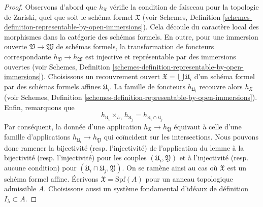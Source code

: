 \begin{proof}
Observons d'abord que $h_\mathfrak X$ vérifie la condition de faisceau pour
la topologie de Zariski, quel que soit le schéma formel $\mathfrak X$ (voir
Schemes, Definition \ref{schemes-definition-representable-by-open-immersions}).
Cela découle du caractère local des morphismes dans la catégorie
des schémas formels. En outre, pour une immersion ouverte
$\mathfrak V \to \mathfrak W$ de schémas formels,
la transformation de foncteurs correspondante $h_\mathfrak V \to h_\mathfrak W$
est injective et représentable par des immersions ouvertes (voir
Schemes, Definition \ref{schemes-definition-representable-by-open-immersions}).
Choisissons un recouvrement ouvert $\mathfrak X = \bigcup \mathfrak U_i$
d'un schéma formel par des schémas formels affines $\mathfrak U_i$.
La famille de foncteurs
$h_{\mathfrak U_i}$ recouvre alors $h_\mathfrak X$ (voir
Schemes, Definition \ref{schemes-definition-representable-by-open-immersions}).
Enfin, remarquons que
$$
h_{\mathfrak U_i} \times_{h_\mathfrak X} h_{\mathfrak U_j} =
h_{\mathfrak U_i \cap \mathfrak U_j}
$$
Par conséquent, la donnée d'une application $h_\mathfrak X \to h_\mathfrak Y$
équivaut à celle d'une famille d'applications
$h_{\mathfrak U_i} \to h_\mathfrak Y$ qui coïncident sur les intersections.
Nous pouvons donc ramener la bijectivité (resp. l'injectivité) de l'application
du lemme à la bijectivité (resp. l'injectivité) pour les couples
$(\mathfrak U_i, \mathfrak Y)$
et à l'injectivité (resp. aucune condition)
pour $(\mathfrak U_i \cap \mathfrak U_j, \mathfrak Y)$.
On se ramène ainsi au cas où $\mathfrak X$ est un
schéma formel affine. Écrivons $\mathfrak X = \text{Spf}(A)$
pour un anneau topologique admissible $A$. Choisissons aussi un
système fondamental d'idéaux de définition $I_\lambda \subset A$.


\end{proof}
